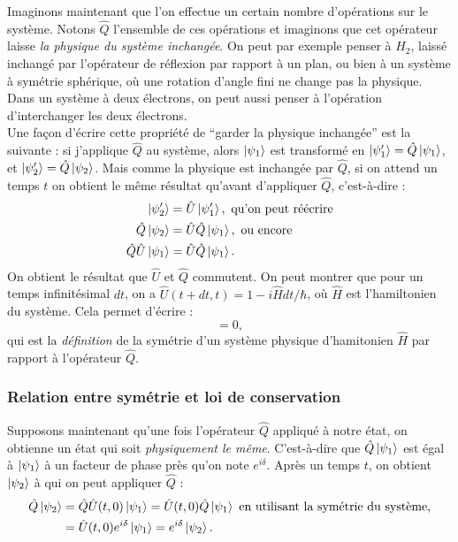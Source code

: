 Imaginons maintenant que l'on effectue un certain nombre d'opérations sur le système. Notons $\hat{Q}$ l'ensemble de ces opérations et imaginons que cet opérateur laisse \textit{la physique du système inchangée}. On peut par exemple penser à $H_2$, laissé inchangé par l'opérateur de réflexion par rapport à un plan, ou bien à un système à symétrie sphérique, où une rotation d'angle fini ne change pas la physique. Dans un système à deux électrons, on peut aussi penser à l'opération d'interchanger les deux électrons. \\
Une façon d'écrire cette propriété de ``garder la physique inchangée'' est la suivante : si j'applique $\hat{Q}$ au système, alors $\ket{\psi_1}$ est transformé en $\ket{\psi'_1}=\hat{Q}\ket{\psi_1}$, et $\ket{\psi'_2}=\hat{Q}\ket{\psi_2}$. Mais comme la physique est inchangée par $\hat{Q}$, si on attend un temps $t$ on obtient le même résultat qu'avant d'appliquer $\hat{Q}$, c'est-à-dire :
\begin{align*}
\ket{\psi'_2}&=\hat{U}\ket{\psi'_1}, \mbox{ qu'on peut réécrire}\\
\hat{Q}\ket{\psi_2}&=\hat{U}\hat{Q}\ket{\psi_1}, \mbox{ ou encore}\\
\hat{Q}\hat{U}\ket{\psi_1}&=\hat{U}\hat{Q}\ket{\psi_1}.
\end{align*}
On obtient le résultat que $\hat{U}$ et $\hat{Q}$ commutent. On peut montrer que pour un temps infinitésimal $dt$, on a $\hat{U}(t+dt,t) = 1-i\hat{H}dt/\hbar$, où $\hat{H}$ est l'hamiltonien du système. Cela permet d'écrire :
\begin{equation*}
[\hat{H},\hat{Q}]=0,
\end{equation*}
qui est la \textit{définition} de la symétrie d'un système physique d'hamitonien $\hat{H}$ par rapport à l'opérateur $\hat{Q}$.

\subsubsection{Relation entre symétrie et loi de conservation}
Supposons maintenant qu'une fois l'opérateur $\hat{Q}$ appliqué à notre état, on obtienne un état qui soit \textit{physiquement le même}. C'est-à-dire que $\hat{Q}\ket{\psi_1}$ est égal à $\ket{\psi_1}$ à un facteur de phase près qu'on note $e^{i\delta}$. Après un temps $t$, on obtient $\ket{\psi_2}$ à qui on peut appliquer $\hat{Q}$ :
\begin{align*}
\hat{Q}\ket{\psi_2}&=\hat{Q}\hat{U}(t,0)\ket{\psi_1}=\hat{U}(t,0)\hat{Q}\ket{\psi_1} \mbox{ en utilisant la symétrie du système,}\\
		&=\hat{U}(t,0)e^{i\delta}\ket{\psi_1}=e^{i\delta}\ket{\psi_2}.
\end{align*}

